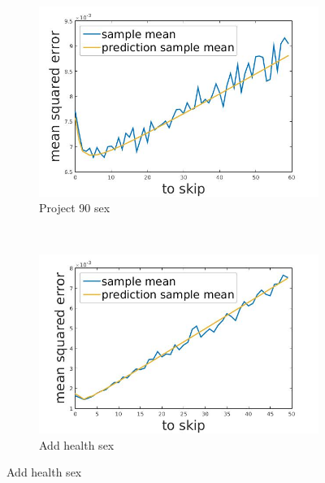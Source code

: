 \documentclass[12pt]{report}
\begin{document}
\begin{figure}[h]
\centering
    \begin{subfigure}[b]{0.4\textwidth}
        \includegraphics[width=\textwidth]{pr90gender}
        \caption{ Project 90 sex}

    \end{subfigure}
    ~
    \begin{subfigure}[b]{0.4\textwidth}
        \includegraphics[width=\textwidth]{studSex}
        \caption{ Add health sex }

    \end{subfigure}

\end{figure}    
\end{document}
